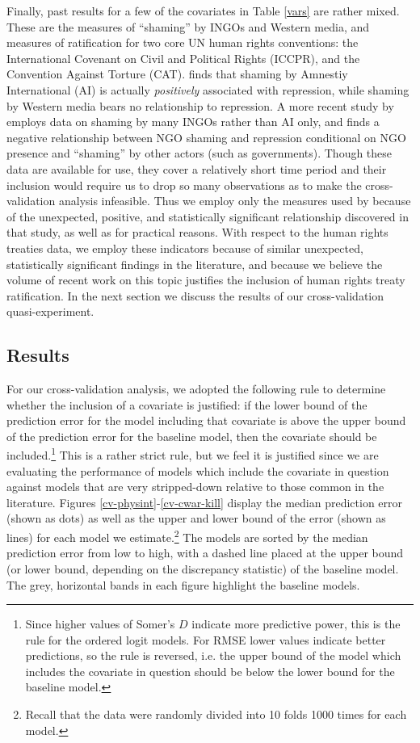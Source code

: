 \documentclass[12pt]{article}
\begin{document}
Finally, past results for a few of the covariates in Table \ref{vars} are rather mixed. These are the measures of ``shaming'' by INGOs and Western media, and measures of ratification for two core UN human rights conventions: the International Covenant on Civil and Political Rights (ICCPR), and the Convention Against Torture (CAT). \citet{HafnerBurton2008} finds that shaming by Amnestiy International (AI) is actually {\it positively} associated with repression, while shaming by Western media bears no relationship to repression. A more recent study by \citet{MurdieDavis2012} employs data on shaming by many INGOs rather than AI only, and finds a negative relationship between NGO shaming and repression conditional on NGO presence and ``shaming'' by other actors (such as governments). Though these data are available for use, they cover a relatively short time period and their inclusion would require us to drop so many observations as to make the cross-validation analysis infeasible. Thus we employ only the measures used by \citet{HafnerBurton2008} because of the unexpected, positive, and statistically significant relationship discovered in that study, as well as for practical reasons. With respect to the human rights treaties data, we employ these indicators because of similar unexpected, statistically significant findings in the literature, and because we believe the volume of recent work on this topic justifies the inclusion of human rights treaty ratification. In the next section we discuss the results of our cross-validation quasi-experiment.

\subsection{Results}

For our cross-validation analysis, we adopted the following rule to determine whether the inclusion of a covariate is justified: if the lower bound of the prediction error for the model including that covariate is above the upper bound of the prediction error for the baseline model, then the covariate should be included.\footnote{Since higher values of Somer's $D$ indicate more predictive power, this is the rule for the ordered logit models. For RMSE lower values indicate better predictions, so the rule is reversed, i.e. the upper bound of the model which includes the covariate in question should be below the lower bound for the baseline model.} This is a rather strict rule, but we feel it is justified since we are evaluating the performance of models which include the covariate in question against models that are very stripped-down relative to those common in the literature. Figures \ref{cv-physint}-\ref{cv-cwar-kill} display the median prediction error (shown as dots) as well as the upper and lower bound of the error (shown as lines) for each model we estimate.\footnote{Recall that the data were randomly divided into 10 folds 1000 times for each model.} The models are sorted by the median prediction error from low to high, with a dashed line placed at the upper bound (or lower bound, depending on the discrepancy statistic) of the baseline model. The grey, horizontal bands in each figure highlight the baseline models. 
\end{document}
